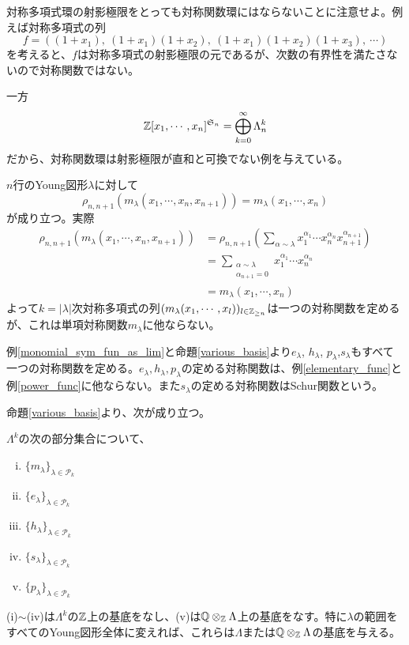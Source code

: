 \documentclass{ltjsreport}
\begin{document}
\begin{notice}
  対称多項式環の射影極限をとっても対称関数環にはならないことに注意せよ。例えば対称多項式の列
  \[
    f=((1+x_1),\:(1+x_1)(1+x_2),\:(1+x_1)(1+x_2)(1+x_3),\:\cdots)
  \]
  を考えると、$f$は対称多項式の射影極限の元であるが、次数の有界性を満たさないので対称関数ではない。

  一方
  \[
  \mathbb{Z}[x_1,\cdots,x_n]^{\mathfrak{S}_n}=\bigoplus_{k=0}^\infty \Lambda^k_n  
  \]
  だから、対称関数環は射影極限が直和と可換でない例を与えている。
\end{notice}


\begin{eg}\label{monomial_sym_fun_as_lim}
  $n$行のYoung図形$\lambda$に対して
  \[
  \rho_{n,n+1}(m_\lambda(x_1,\cdots,x_n,x_{n+1}))=m_\lambda(x_1,\cdots,x_n)  
  \]
  が成り立つ。実際
  \begin{align*}
    \rho_{n,n+1}(m_\lambda(x_1,\cdots,x_n,x_{n+1}))
    &=\rho_{n,n+1}\left(
      \sum_{\alpha\sim\lambda}x_1^{\alpha_1}\cdots x_n^{\alpha_n}x_{n+1}^{\alpha_{n+1}}
      \right)\\
    &=\sum_{\substack{\alpha\sim\lambda \\ \alpha_{n+1}=0}}x_1^{\alpha_1}\cdots x_n^{\alpha_n}\\
    &=m_\lambda(x_1,\cdots,x_n)
  \end{align*}
  よって$k=|\lambda|$次対称多項式の列$(m_\lambda(x_1,\cdots,x_l))_{l\in\mathbb{Z}_{\geq n}}$は一つの対称関数を定めるが、これは単項対称関数$m_\lambda$に他ならない。
\end{eg}

\begin{eg}
  例\ref{monomial_sym_fun_as_lim}と命題\ref{various_basis}より$e_\lambda$, $h_\lambda$, $p_\lambda$,$s_\lambda$もすべて一つの対称関数を定める。$e_\lambda,h_\lambda,p_\lambda$の定める対称関数は、例\ref{elementary_func}と例\ref{power_func}に他ならない。また$s_\lambda$の定める対称関数はSchur関数という。
\end{eg}

命題\ref{various_basis}より、次が成り立つ。

\begin{prop}\label{various_symfunc_basis}
  $\Lambda^k$の次の部分集合について、
  \begin{enumerate}[(i)]
    \item $\{m_\lambda\}_{\lambda\in\mathcal{P}_k}$
    \item $\{e_\lambda\}_{\lambda\in\mathcal{P}_k}$
    \item $\{h_\lambda\}_{\lambda\in\mathcal{P}_k}$
    \item $\{s_\lambda\}_{\lambda\in\mathcal{P}_k}$
    \item $\{p_\lambda\}_{\lambda\in\mathcal{P}_k}$
  \end{enumerate}
  (i)$\sim$(iv)は$\Lambda^k$の$\mathbb{Z}$上の基底をなし、(v)は$\mathbb{Q}\otimes_{\mathbb{Z}}{\Lambda}$上の基底をなす。特に$\lambda$の範囲をすべてのYoung図形全体に変えれば、これらは$\Lambda$または$\mathbb{Q}\otimes_{\mathbb{Z}}{\Lambda}$の基底を与える。
\end{prop}
\end{document}
